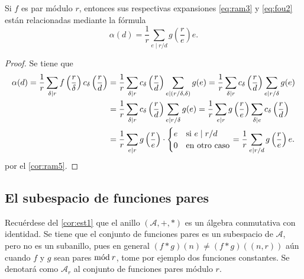 \begin{theorem}
Si $f$ es par módulo $r$, entonces sus respectivas expansiones \eqref{eq:ram3} y \eqref{eq:fou2} están relacionadas mediante la fórmula
\begin{equation*}
    \alpha(d) = \frac{1}{r} \sum_{e \mid r/d} g \left( \frac{r}{e} \right) e.
\end{equation*}
\end{theorem}
\begin{proof}
Se tiene que
\begin{align*}
    \alpha(d) = \frac{1}{r} \sum_{\delta \mid r} f \left( \frac{r}{\delta} \right) c_{\delta} \left( \frac{r}{d} \right) & = \frac{1}{r} \sum_{\delta \mid r} c_{\delta} \left( \frac{r}{d} \right) \sum_{e \mid (r/\delta,\delta)} g(e) = \frac{1}{r} \sum_{\delta \mid r} c_{\delta} \left( \frac{r}{d} \right) \sum_{e \mid r/\delta} g(e) \\
              & = \frac{1}{r} \sum_{\delta \mid r} c_{\delta} \left( \frac{r}{d} \right) \sum_{e \mid r/\delta} g(e) = \frac{1}{r} \sum_{e \mid r} g \left( \frac{r}{e} \right) \sum_{\delta \mid e} c_{\delta} \left( \frac{r}{d} \right) \\
              & = \frac{1}{r} \sum_{e \mid r} g \left( \frac{r}{e} \right) \cdot \begin{cases}
                  \hfil e & \text{si } e \mid r/d \\
                  \hfil 0 & \text{en otro caso} \\
              \end{cases} = \frac{1}{r} \sum_{e \mid r/d} g \left( \frac{r}{e} \right) e.
\end{align*}
por el \cref{cor:ram5}.
\end{proof}

\subsection{El subespacio de funciones pares}

Recuérdese del \cref{cor:est1} que el anillo $(\mathcal{A}, +, *)$ es un álgebra conmutativa con identidad. Se tiene que el conjunto de funciones pares es un subespacio de $\mathcal{A}$, pero no es un subanillo, pues en general $(f*g)(n) \ne (f*g)((n,r))$ aún cuando $f$ y $g$ sean pares $\mathrm{m\acute{o}d\:}r$, tome por ejemplo dos funciones constantes. Se denotará como $\mathcal{A}_r$ al conjunto de funciones pares módulo $r$.

